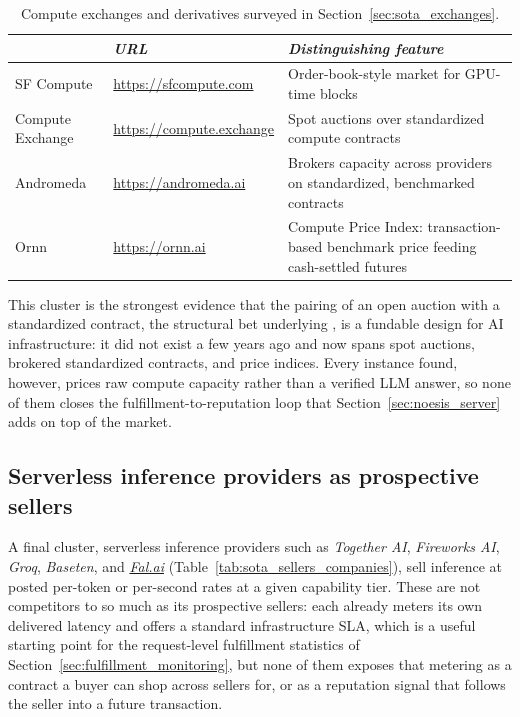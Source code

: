 \begin{samepage}
  \begin{table}[H]
    \centering
    \footnotesize
    \begin{tabular}{l|l|p{5.8cm}|}
                        & \emph{URL} & \emph{Distinguishing feature} \\
      \hline
      SF Compute         & \url{https://sfcompute.com} & Order-book-style market for GPU-time blocks \\
      \hline
      Compute Exchange   & \url{https://compute.exchange} & Spot auctions over standardized compute contracts \\
      \hline
      Andromeda          & \url{https://andromeda.ai} & Brokers capacity across providers on standardized, benchmarked contracts \\
      \hline
      Ornn               & \url{https://ornn.ai} & Compute Price Index: transaction-based benchmark price feeding cash-settled futures \\
      \hline
    \end{tabular}
    \caption{Compute exchanges and derivatives surveyed in
      Section~\ref{sec:sota_exchanges}.}
    \label{tab:sota_exchanges_companies}
  \end{table}
\end{samepage}

This cluster is the strongest evidence that the pairing of an open auction with
a standardized contract, the structural bet underlying \NoesisMarket, is a
fundable design for AI infrastructure: it did not exist a few years ago and now
spans spot auctions, brokered standardized contracts, and price indices. Every
instance found, however, prices raw compute capacity rather than a verified LLM
answer, so none of them closes the fulfillment-to-reputation loop that
Section~\ref{sec:noesis_server} adds on top of the market.

\subsection{Serverless inference providers as prospective sellers}
\label{sec:sota_sellers}

A final cluster, serverless inference providers such as \emph{Together AI},
\emph{Fireworks AI}, \emph{Groq}, \emph{Baseten}, and \emph{\href{https://fal.ai}{Fal.ai}}
(Table~\ref{tab:sota_sellers_companies}),
sell inference at posted per-token or per-second rates at a given
capability tier. These are not competitors to \Noesis{} so much as its
prospective sellers: each already meters its own delivered latency and
offers a standard infrastructure SLA, which is a useful starting point for
the request-level fulfillment statistics of
Section~\ref{sec:fulfillment_monitoring}, but none of them exposes that
metering as a contract a buyer can shop across sellers for, or as a
reputation signal that follows the seller into a future transaction.

